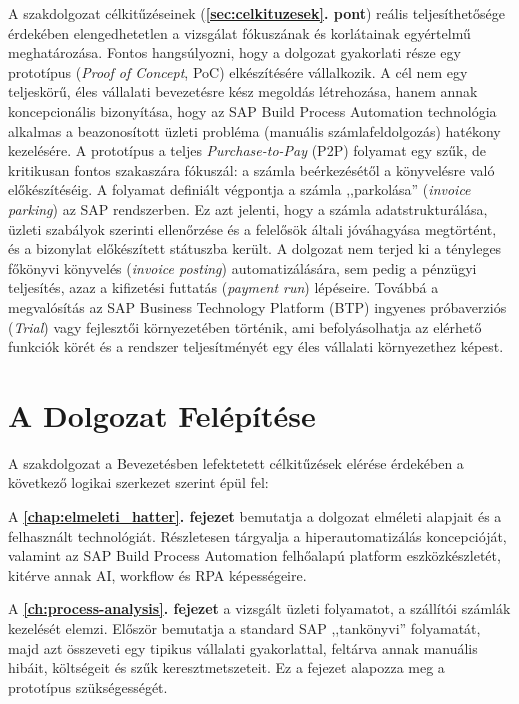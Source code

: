 A szakdolgozat célkitűzéseinek (\textbf{\ref{sec:celkituzesek}. pont}) reális teljesíthetősége érdekében elengedhetetlen a vizsgálat fókuszának és korlátainak egyértelmű meghatározása.
Fontos hangsúlyozni, hogy a dolgozat gyakorlati része egy prototípus (\textit{Proof of Concept}, PoC) elkészítésére vállalkozik.
A cél nem egy teljeskörű, éles vállalati bevezetésre kész megoldás létrehozása, hanem annak koncepcionális bizonyítása, hogy az SAP Build Process Automation technológia alkalmas a beazonosított üzleti probléma (manuális számlafeldolgozás) hatékony kezelésére.
A prototípus a teljes \textit{Purchase-to-Pay} (P2P) folyamat egy szűk, de kritikusan fontos szakaszára fókuszál: a számla beérkezésétől a könyvelésre való előkészítéséig.
A folyamat definiált végpontja a számla ,,parkolása'' (\textit{invoice parking}) az SAP rendszerben.
Ez azt jelenti, hogy a számla adatstrukturálása, üzleti szabályok szerinti ellenőrzése és a felelősök általi jóváhagyása megtörtént, és a bizonylat előkészített státuszba került.
A dolgozat nem terjed ki a tényleges főkönyvi könyvelés (\textit{invoice posting}) automatizálására, sem pedig a pénzügyi teljesítés, azaz a kifizetési futtatás (\textit{payment run}) lépéseire.
Továbbá a megvalósítás az SAP Business Technology Platform (BTP) ingyenes próbaverziós (\textit{Trial}) vagy fejlesztői környezetében történik, ami befolyásolhatja az elérhető funkciók körét és a rendszer teljesítményét egy éles vállalati környezethez képest.


\section{A Dolgozat Felépítése}
\label{sec:dolgozat_felepitese}

A szakdolgozat a Bevezetésben lefektetett célkitűzések elérése érdekében a következő logikai szerkezet szerint épül fel:

A \textbf{\ref{chap:elmeleti_hatter}. fejezet} bemutatja a dolgozat elméleti alapjait és a felhasznált technológiát.
Részletesen tárgyalja a hiperautomatizálás koncepcióját, valamint az SAP Build Process Automation felhőalapú platform eszközkészletét, kitérve annak AI, workflow és RPA képességeire.

A \textbf{\ref{ch:process-analysis}. fejezet} a vizsgált üzleti folyamatot, a szállítói számlák kezelését elemzi.
Először bemutatja a standard SAP ,,tankönyvi'' folyamatát, majd azt összeveti egy tipikus vállalati gyakorlattal, feltárva annak manuális hibáit, költségeit és szűk keresztmetszeteit.
Ez a fejezet alapozza meg a prototípus szükségességét.

